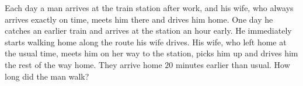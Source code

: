 Each day a man arrives at the train station after work, and his wife, who always arrives exactly on time, meets him there and drives him home. One day he catches an earlier train and arrives at the station an hour early. He immediately starts walking home along the route his wife drives. His wife, who left home at the usual time, meets him on her way to the station, picks him up and drives him the rest of the way home. They arrive home $20$ minutes earlier than usual. How long did the man walk?
